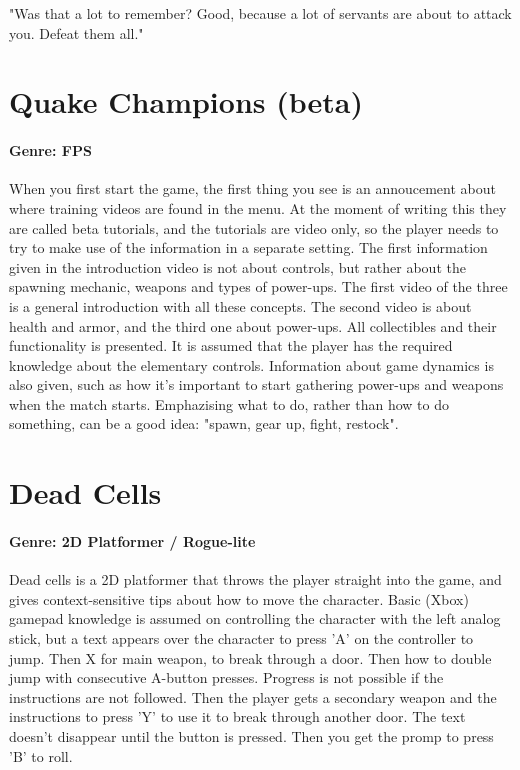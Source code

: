 "Was that a lot to remember?
Good, because a lot of servants are about to attack you.
Defeat them all."

\section{Quake Champions (beta)}
\paragraph{Genre: FPS}

When you first start the game, the first thing you see is an annoucement about
where training videos are found in the menu. At the moment of writing this
they are called beta tutorials, and the tutorials are video only, so the
player needs to try to make use of the information in a separate setting. The
first information given in the introduction video is not about controls, but
rather about the spawning mechanic, weapons and types of power-ups. The first
video of the three is a general introduction with all these concepts. The
second video is about health and armor, and the third one about power-ups.
All collectibles and their functionality is presented. It is assumed that the
player has the required knowledge about the elementary controls. Information about game dynamics is also given, such as how it's important to start gathering power-ups and weapons when the match starts. Emphazising what to do, rather than how to do something, can be a good idea: "spawn, gear up, fight, restock".

\section{Dead Cells}
\paragraph{Genre: 2D Platformer / Rogue-lite}

Dead cells is a 2D platformer that throws the player straight into the game, and gives context-sensitive tips about how to move the character. Basic (Xbox) gamepad knowledge is assumed on controlling the character with the left analog stick, but a text appears over the character to press 'A' on the controller to jump. Then X for main weapon, to break through a door. Then how to double jump with consecutive A-button presses. Progress is not possible if the instructions are not followed. Then the player gets a secondary weapon and the instructions to press 'Y' to use it to break through another door. The text doesn't disappear until the button is pressed. Then you get the promp to press 'B' to roll.

